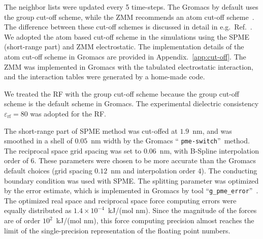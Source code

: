 \documentclass[a4paper,preprint,unsortedaddress,onecolumn,fleqn]{revtex4}
\newcommand{\recheck}[1]{{\color{red} #1}}
\begin{document}
The neighbor lists were updated every 5 time-steps. The Gromacs by default
uses the group cut-off scheme, while the ZMM recommends
an atom cut-off scheme~\cite{fukuda2011molecular,fukuda2013zero}. The difference between these cut-off
schemes is discussed in detail in e.g.~Ref.~\cite%
{hunenberger1998alternative,baumketner2009removing}. We adopted the atom
based cut-off scheme in the simulations using the SPME (short-range part)
and ZMM electrostatic. The implementation details of the
atom cut-off scheme in Gromacs are provided in Appendix.~\ref{app:cut-off}.
The ZMM was implemented in Gromacs with the tabulated electrostatic
interaction, and the interaction tables were generated by a home-made code. 

We treated the RF with the group cut-off scheme because the
group cut-off scheme is the default scheme in Gromacs. The experimental
dielectric consistency $\varepsilon _{\text{rf}}=80$ was adopted for the RF.

The short-range part of SPME method was cut-offed at $1.9$~nm, and was
smoothed in a shell of $0.05$~nm width by the Gromacs \textquotedblleft 
\texttt{pme-switch}\textquotedblright\ method. The reciprocal space grid
spacing was set to $0.06$~nm, with B-Spline interpolation order of $6$.
These parameters were chosen to be more accurate than the Gromacs default
choices (grid spacing $0.12$~nm and interpolation order $4$). The conducting
boundary condition was used with SPME. The splitting parameter was optimized
by the error estimate, which is implemented in Gromacs by tool
\textquotedblleft \texttt{g\_pme\_error}\textquotedblright ~\cite%
{wang2010optimizing}. The optimized real space and reciprocal space force
computing errors were equally distributed as $1.4\times 10^{-4}$~kJ/(mol
nm). Since the magnitude of the forces are of order $10^{2}$~kJ/(mol nm),
this force computing precision almost reaches the limit of the
single-precision representation of the floating point numbers. 
\end{document}
